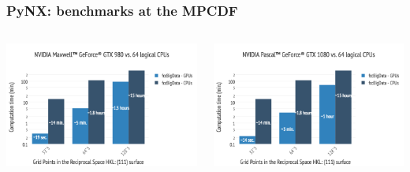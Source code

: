 \documentclass[]{beamer}
\begin{document}
\begin{frame}
\frametitle{PyNX: benchmarks at the MPCDF}
\begin{columns}
\begin{minipage}[c][0.4\textheight][c]{\linewidth}
  \centering
  \includegraphics[width=0.8\linewidth]{pics/PyNX_runtest_DRACOgpu.png}
\end{minipage}
\begin{minipage}[c][0.4\textheight][c]{\linewidth}
  \centering
  \includegraphics[width=0.8\linewidth]{pics/PascalGPUvsCPU.png}


\end{minipage}
\end{columns}
\end{frame}
\end{document}
